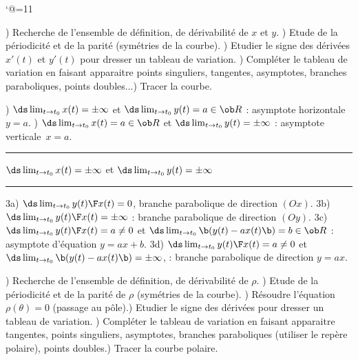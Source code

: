 \catcode`@=11\relax



\vglue-10mm
\bigskip

\Methode [Courbe paramétrée cartésienne {$\vec {OM}(t) = x(t)\vec i+y(t)\vec j$}]
\medskip{}) Recherche de l'ensemble de définition, de dérivabilité de $x$ et $y$. \PAR{}) Etude de la périodicité et de la parité (symétries de la courbe). \PAR{}) Etudier le signe des dérivées $x'(t)$ et $y'(t)$ pour dresser un tableau de variation. \PAR{}) Compléter le tableau de variation en faisant apparaitre points singuliers, tangentes, asymptotes,
branches paraboliques, points doubles...\PAR{}) Tracer la courbe.



\Methode [Branche infinie en $t_0$ d'une courbe  paramétrée cartésienne {$\vec {OM} (t)= x(t)\vec i+y(t)\vec j$}]
\medskip{}) $\ds\lim_{t\to t_0}x(t)=\pm\infty$ et $\ds\lim_{t\to t_0}y(t)=a\in\ob R$ : asymptote horizontale~$y=a$. 
\PAR{}) $\ds\lim_{t\to t_0}x(t)=a\in\ob R$ et $\ds\lim_{t\to t_0}y(t)=\pm\infty$ : asymptote verticale~$x=a$. 
\PAR\noindent
\smallskip\noindent\hrule\smallskip
\centerline{$\ds\lim_{t\to t_0}x(t)=\pm\infty$ et $\ds\lim_{t\to t_0}y(t)=\pm\infty$}
\PAR\noindent\hrule\smallskip\noindent
3a) $\ds \lim_{t\to t_0}{y(t)\F x(t)}=0$, branche parabolique de direction $(Ox)$. 
\PAR\noindent
3b) $\ds \lim_{t\to t_0}{y(t)\F x(t)}=\pm\infty$ : branche parabolique de direction $(Oy)$.
\PAR\noindent
3c) $\ds \lim_{t\to t_0}{y(t)\F x(t)}=a\neq0$ et $\ds\lim_{t\to t_0}\b(y(t)-ax(t)\b)=b\in\ob R$ : asymptote d'équation $y=ax+b$. 
\PAR\noindent
3d) $\ds \lim_{t\to t_0}{y(t)\F x(t)}=a\neq0$ et $\ds\lim_{t\to t_0}\b(y(t)-ax(t)\b)=\pm\infty$, : branche  parabolique de direction $y=ax$. 
\medskip


\Methode [Courbe paramétrée polaire {$\vec {OM}(\theta) = \rho(\theta)\vec u$}]
\medskip{}) Recherche de l'ensemble de définition, de dérivabilité de $\rho$. \PAR{}) Etude de la périodicité et de la parité de $\rho$ (symétries de la courbe). \PAR{}) Résoudre l'équation $\rho(\theta)=0$ (passage au pôle).\PAR{}) Etudier le signe des dérivées pour dresser un tableau de variation. \PAR{}) Compléter le tableau de variation en faisant apparaitre  tangentes, points singuliers, asymptotes,
branches paraboliques (utiliser le repère polaire), points doubles.\PAR{}) Tracer la courbe polaire.

